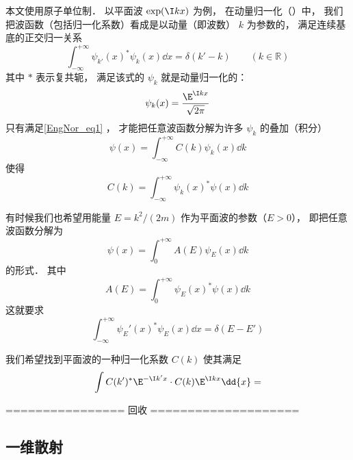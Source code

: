 
\begin{issues}
\issueDraft
\end{issues}


本文使用原子单位制． 以平面波 $\exp(\I kx)$ 为例， 在动量归一化（）中， 我们把波函数（包括归一化系数）看成是以动量（即波数） $k$ 为参数的， 满足连续基底的正交归一关系%
\begin{equation}\label{EngNor_eq1}
\int_{-\infty}^{+\infty} \psi_{k'}(x)^* \psi_{k}(x) \dd{x} = \delta(k' - k) \qquad (k \in \mathbb R)
\end{equation}
其中 $*$ 表示复共轭， 满足该式的 $\psi_k$ 就是动量归一化的：%
\begin{equation}
\psi_k(x) = \frac{\E^{\I kx}}{\sqrt{2\pi}}
\end{equation}
只有满足\autoref{EngNor_eq1} ， 才能把任意波函数分解为许多 $\psi_{k}$ 的叠加（积分）
\begin{equation}
\psi(x) = \int_{-\infty}^{+\infty} C(k)\psi_{k}(x) \dd{k}
\end{equation}
使得
\begin{equation}
C(k) = \int_{-\infty}^{+\infty} \psi_{k}(x)^* \psi(x) \dd{k}
\end{equation}

有时候我们也希望用能量 $E = k^2/(2m)$ 作为平面波的参数（$E > 0$）， 即把任意波函数分解为
\begin{equation}
\psi(x) = \int_{0}^{+\infty} A(E)\psi_E(x) \dd{k}
\end{equation}
的形式． 其中
\begin{equation}
A(E) = \int_{0}^{+\infty} \psi_E(x)^* \psi(x) \dd{k}
\end{equation}
这就要求
\begin{equation}
\int_{-\infty}^{+\infty} \psi_E'(x)^* \psi_E(x) \dd{x} = \delta(E - E')
\end{equation}


我们希望找到平面波的一种归一化系数 $C(k)$ 使其满足
\begin{equation}
\int C(k')^* \E^{-\I k' x} \cdot C(k) \E^{\I kx} \dd{x} = 
\end{equation}


================ 回收 ====================

\subsection{一维散射} %

